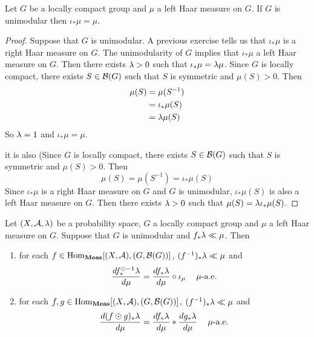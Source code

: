 \documentclass{book}
\begin{document}
	\begin{ex}  
		Let $G$ be a locally compact group and $\mu$ a left Haar measure on $G$. If $G$ is unimodular then $\iota_*\mu = \mu$.
	\end{ex}

	\begin{proof}
		Suppose that $G$ is unimodular. A previous exercise tells us that $\iota_*\mu$ is a right Haar measure on $G$. The unimodularity of $G$ implies that $\iota_*\mu$ a left Haar measure on $G$. Then there exists $\lambda >0$ such that $\iota_*\mu = \lambda \mu$. Since $G$ is locally compact, there exists $S \in \mathcal{B}(G)$ such that $S$ is symmetric and $\mu(S) > 0$. Then 
		\begin{align*}
			\mu(S) 
			& = \mu(S^{-1}) \\
			& = \iota_*\mu(S) \\
			& = \lambda \mu(S) 
		\end{align*}	
		So $\lambda = 1$ and $\iota_*\mu = \mu$.

		it is also (Since $G$ is locally compact, there exists $S \in \mathcal{B}(G)$ such that $S$ is symmetric and $\mu(S) > 0$. Then 
		$$\mu(S) = \mu(S^{-1}) = \iota_*\mu(S)$$ Since $\iota_*\mu$ is a right Haar measure on $G$ and $G$ is unimodular, $\iota_*\mu(S)$ is also a left Haar measure on $G$. Then there exists $\lambda > 0$ such that $\mu(S) = \lambda\iota_*\mu(S)$.
	\end{proof}

	\begin{ex}
		Let $(X, \mathcal{A}, \lambda)$ be a probability space, $G$ a locally compact group and $\mu$ a left Haar measure on $G$. Suppose that $G$ is unimodular and $f_*\lambda \ll \mu$. Then 
		\begin{enumerate}
			\item for each $f \in \operatorname{Hom}_{\operatorname*{\text{\textbf{Meas}}}}[(X, \mathcal{A}), (G, \mathcal{B}(G))]$, $(f^{-1})_*\lambda \ll \mu$ and 
			$$\frac{d f^{\odot -1}_*\lambda}{d \mu} = \frac{d f_*\lambda }{d\mu} \circ \iota_{\mu} \text{ \hspace{.2cm} $\mu$-a.e.}$$ 
			\item for each $f,g \in \operatorname{Hom}_{\operatorname*{\text{\textbf{Meas}}}}[(X, \mathcal{A}), (G, \mathcal{B}(G))]$, $(f^{-1})_*\lambda \ll \mu$ and 
			$$\frac{d (f \odot g)_*\lambda}{d \mu} = \frac{d f_*\lambda }{d\mu} * \frac{d g_*\lambda }{d\mu} \text{ \hspace{.2cm} $\mu$-a.e.}$$ 
		\end{enumerate} 
	\end{ex}
\end{document}
